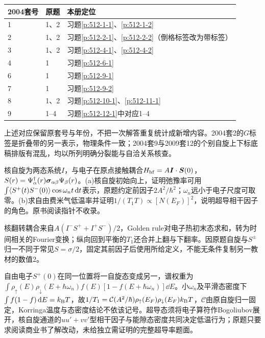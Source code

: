 \begin{center}\begin{tabular}{lll}\toprule 2004套号&原题&本册定位\\\midrule
1&1、2&习题\ref{p:512-1-1}、\ref{p:512-1-2}\\
2&1、2&习题\ref{p:512-2-1}、\ref{p:512-2-2}（倒格标签改为带标签）\\
3&1、2&习题\ref{p:512-4-1}、\ref{p:512-4-2}\\
4&1&习题\ref{p:512-6-1}\\
6&1&习题\ref{p:512-9-1}\\
7&1&习题\ref{p:512-9-2}\\
8&1、2&习题\ref{p:512-10-1}、\ref{p:512-11-1}\\
9&1--4&习题\ref{p:512-12-1}中对应1--4\\\bottomrule\end{tabular}\end{center}
上述对应保留原套号与年份，不把一次解答重复统计成新增内容。2004套2的$G$标签是折叠带的另一表示，物理条件一致；2004套9与2009套12的个别自旋上下标底稿排版有混乱，均以所列明确分裂能与自洽关系核查。
\begin{exercise}[原题2(a)--(b)]
核自旋为两态系统$I$，与电子在原点接触耦合$H_{\rm hf}=A\boldsymbol{I}\cdot\boldsymbol{S}(0)$，$S(r)=\Psi_\alpha^\dagger(r)\boldsymbol{\sigma}_{\alpha\beta}\Psi_\beta(r)$。(a)核自旋初始向上，证明弛豫率可用$\int\langle S^+(t)S^-(0)\rangle\cos\omega_nt\,\mathrm d t$表示，原题约定前因子$2A^2/\hbar^2$；$\omega_n$远小于电子尺度可取零。(b)求自由费米气低温率并证明$1/(T_1T)\propto[N(E_F)]^2$，说明超导相干因子的角色。原书阅读指针不收录。
\end{exercise}
\begin{solution}
核翻转耦合来自$A(I^-S^++I^+S^-)/2$，Golden rule对电子热初末态求和，转为时间相关的Fourier变换；纵向回到平衡的$T_1$还合并上翻与下翻率。因原题自旋与$S^\pm$归一不同于常见$S=\sigma/2$，固定其前因子后使用所给定义，不能无条件复制另一教材的数值2。

自由电子$S^+(0)$在同一位置将一自旋态变成另一，谱权重为$\int\rho_\uparrow(E)\rho_\downarrow(E+\hbar\omega_n)f(E)[1-f(E+\hbar\omega_n)]\dd E$。小$\omega_n$及平滑态密度下$\int f(1-f)\,\mathrm d E=k_{\mathrm B} T$，故$1/T_1=\mathcal C(A^2/\hbar)\rho_\uparrow(E_F)\rho_\downarrow(E_F)k_{\mathrm B} T$，$\mathcal C$由原自旋归一固定，Korringa温度与态密度结论不依该记号。超导态须将电子算符作Bogoliubov展开，核自旋通道的$uu'+vv'$型相干因子与能隙态密度共同决定低温行为；原题只要求阅读商业书了解改动，未给独立需证明的完整超导率题面。
\end{solution}
